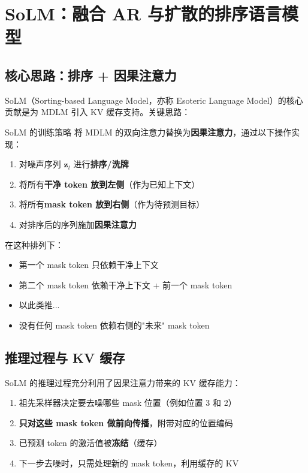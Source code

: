 \section{SoLM：融合 AR 与扩散的排序语言模型}

\subsection{核心思路：排序 + 因果注意力}

SoLM（Sorting-based Language Model，亦称 Esoteric Language Model）的核心贡献是为 MDLM 引入 KV 缓存支持。关键思路：

\begin{importantbox}{SoLM 的训练策略}
将 MDLM 的双向注意力替换为\textbf{因果注意力}，通过以下操作实现：
\begin{enumerate}
    \item 对噪声序列 $\mathbf{z}_t$ 进行\textbf{排序/洗牌}
    \item 将所有\textbf{干净 token 放到左侧}（作为已知上下文）
    \item 将所有\textbf{mask token 放到右侧}（作为待预测目标）
    \item 对排序后的序列施加\textbf{因果注意力}
\end{enumerate}
\end{importantbox}

在这种排列下：
\begin{itemize}
    \item 第一个 mask token 只依赖干净上下文
    \item 第二个 mask token 依赖干净上下文 + 前一个 mask token
    \item 以此类推...
    \item 没有任何 mask token 依赖右侧的"未来" mask token
\end{itemize}

\subsection{推理过程与 KV 缓存}

SoLM 的推理过程充分利用了因果注意力带来的 KV 缓存能力：

\begin{enumerate}
    \item 祖先采样器决定要去噪哪些 mask 位置（例如位置 3 和 2）
    \item \textbf{只对这些 mask token 做前向传播}，附带对应的位置编码
    \item 已预测 token 的激活值被\textbf{冻结}（缓存）
    \item 下一步去噪时，只需处理新的 mask token，利用缓存的 KV
\end{enumerate}

